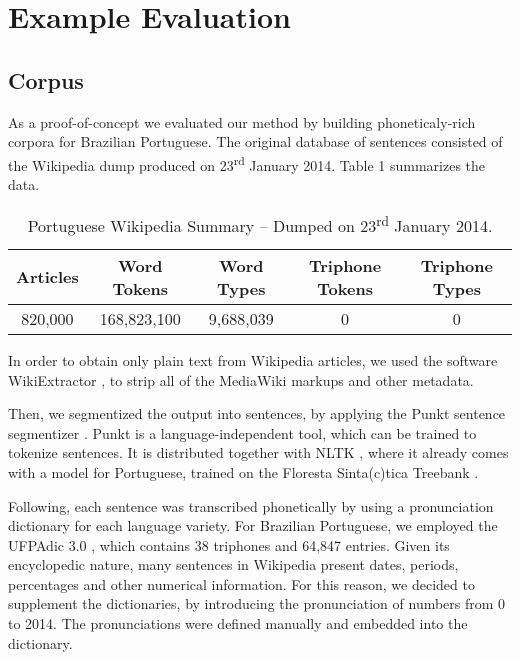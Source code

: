 \section{Example Evaluation}
\subsection{Corpus}

As a proof-of-concept we evaluated our method by building phoneticaly-rich corpora for Brazilian Portuguese. The original 
database of sentences consisted of the Wikipedia dump produced on 23\textsuperscript{rd} January 2014.
Table 1 summarizes the data.

\begin{table}[H]
\begin{center}
\begin{tabular}{|c|c|c|c|c|}
\hline \bf Articles & \bf Word Tokens  & \bf Word Types & \bf Triphone Tokens & \bf Triphone Types\\\hline
820,000 & 168,823,100 & 9,688,039 & 0 & 0\\
\hline
\end{tabular}
\end{center}
\caption{\label{wikipedia-summary} Portuguese Wikipedia Summary -- Dumped on 23\textsuperscript{rd} January 2014.}
\end{table}

In order to obtain only plain text from Wikipedia articles, we used the software WikiExtractor \cite{Wikiextractor2013}, to strip 
all of the MediaWiki markups and other metadata. 

Then, we segmentized the output into sentences, by applying the Punkt sentence segmentizer \cite{Kiss2006}. Punkt is a
language-independent tool, which can be trained to tokenize sentences. It is distributed together with NLTK \cite{NLTK2009}, where it 
already comes with a model for Portuguese, trained on the Floresta Sinta(c)tica Treebank \cite{Floresta2008}.

Following, each sentence was transcribed phonetically by using a pronunciation dictionary for each language variety. 
For Brazilian Portuguese, we employed the UFPAdic 3.0 \cite{Neto2011}, which contains 38 triphones and 64,847 entries. Given 
its encyclopedic nature, many sentences in Wikipedia present dates, periods, percentages and other numerical information. 
For this reason, we decided to supplement the dictionaries, by introducing the pronunciation of numbers from 0 to 2014. The
pronunciations were defined manually and embedded into the dictionary.

